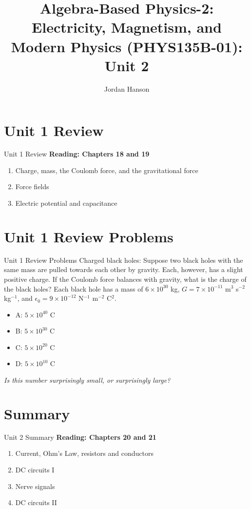 \documentclass{beamer}
\title{Algebra-Based Physics-2: Electricity, Magnetism, and Modern Physics (PHYS135B-01): Unit 2}
\author{Jordan Hanson}
\institute{Whittier College Department of Physics and Astronomy}
\begin{document}
\maketitle

\section{Unit 1 Review}

\begin{frame}{Unit 1 Review}
\textbf{Reading: Chapters 18 and 19}
\begin{enumerate}
\item Charge, mass, the Coulomb force, and the gravitational force
\item Force fields
\item Electric potential and capacitance
\end{enumerate}
\end{frame}

\section{Unit 1 Review Problems}

\begin{frame}{Unit 1 Review Problems}
\small
\alert{Charged black holes}: Suppose two black holes with the same mass are pulled towards each other by gravity.  Each, however, has a slight positive charge.  If the Coulomb force balances with gravity, what is the charge of the black holes?  Each black hole has a mass of $6 \times 10^{30}$ kg, $G = 7 \times 10^{-11}$ m$^3$ s$^{-2}$ kg$^{-1}$, and $\epsilon_0 = 9\times 10^{-12}$ N$^{-1}$ m$^{-2}$ C$^{2}$.
\begin{itemize}
\item A: $5 \times 10^{40}$ C
\item B: $5 \times 10^{30}$ C
\item C: $5 \times 10^{20}$ C
\item D: $5 \times 10^{10}$ C
\end{itemize}
\textit{Is this number surprisingly small, or surprisingly large?}
\end{frame}

\section{Summary}

\begin{frame}{Unit 2 Summary}
\textbf{Reading: Chapters 20 and 21}
\begin{enumerate}
\item Current, Ohm's Law, resistors and conductors
\item DC circuits I
\item Nerve signals
\item \alert{DC circuits II}
\end{enumerate}
\end{frame}
\end{document}
